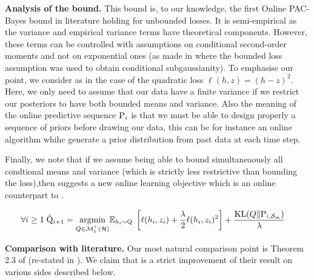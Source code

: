 \textbf{Analysis of the bound.} This bound is, to our knowledge, the first Online PAC-Bayes bound in literature holding for unbounded losses. It is semi-empirical as the variance and empirical variance terms have theoretical components. However, these terms can be controlled with assumptions on conditional second-order moments and not on exponential ones (as made in \citealp{haddouche2022online} where the bounded loss assumption was used to obtain conditional subgaussianity). To emphasise our point, we consider as in  the case of the quadratic loss $\ell(h,z)= (h-z)^2$. Here, we only need to assume that our data have a finite variance if we restrict our posteriors to have both bounded means and variance. Also the meaning of the online predictive sequence $\P_{i}$ is that we must be able to design properly a sequence of priors before drawing our data, this can be for instance an online algorithm whihc generate a prior distribution from past data at each time step.

Finally, we note that if we assume being able to bound simultaneaously all condtional means and variance (which is strictly less restrictive than bounding the loss),then   suggests a new online learning objective which is an online counterpart to .

\begin{align}
    \forall i\geq1\; \hat{\Q}_{i+1}&= \underset{Q\in\mathcal{M}^+_1(\mathcal{H})}{\mathrm{argmin}} \mathbb{E}_{h_i\sim \Q} \; \left[\ell(h_i,z_i)+ \frac{\lambda}{2}\ell(h_i,z_i)^2\right] + \frac{\operatorname{KL}(Q\| \P_{i,\Sm})}{\lambda}
\end{align}

\textbf{Comparison with literature.} Our most natural comparison point is Theorem 2.3 of \cite{haddouche2022online} (re-stated in ). We claim that  is a strict improvement of their result on various sides described below.

